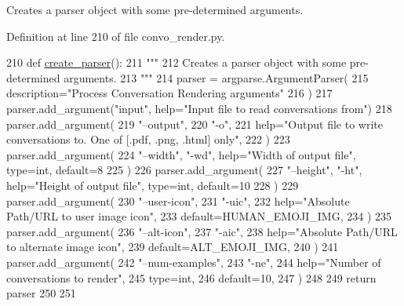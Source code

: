 \begin{DoxyVerb}Creates a parser object with some pre-determined arguments.
\end{DoxyVerb}
 

Definition at line 210 of file convo\+\_\+render.\+py.


\begin{DoxyCode}
210 \textcolor{keyword}{def }\hyperlink{namespaceparlai_1_1scripts_1_1convo__render_a4220e40f3e0c5ac320177b6e0f3d8e83}{create\_parser}():
211     \textcolor{stringliteral}{"""}
212 \textcolor{stringliteral}{    Creates a parser object with some pre-determined arguments.}
213 \textcolor{stringliteral}{    """}
214     parser = argparse.ArgumentParser(
215         description=\textcolor{stringliteral}{"Process Conversation Rendering arguments"}
216     )
217     parser.add\_argument(\textcolor{stringliteral}{"input"}, help=\textcolor{stringliteral}{"Input file to read conversations from"})
218     parser.add\_argument(
219         \textcolor{stringliteral}{"--output"},
220         \textcolor{stringliteral}{"-o"},
221         help=\textcolor{stringliteral}{"Output file to write conversations to. One of [.pdf, .png, .html] only"},
222     )
223     parser.add\_argument(
224         \textcolor{stringliteral}{"--width"}, \textcolor{stringliteral}{"-wd"}, help=\textcolor{stringliteral}{"Width of output file"}, type=int, default=8
225     )
226     parser.add\_argument(
227         \textcolor{stringliteral}{"--height"}, \textcolor{stringliteral}{"-ht"}, help=\textcolor{stringliteral}{"Height of output file"}, type=int, default=10
228     )
229     parser.add\_argument(
230         \textcolor{stringliteral}{"--user-icon"},
231         \textcolor{stringliteral}{"-uic"},
232         help=\textcolor{stringliteral}{"Absolute Path/URL to user image icon"},
233         default=HUMAN\_EMOJI\_IMG,
234     )
235     parser.add\_argument(
236         \textcolor{stringliteral}{"--alt-icon"},
237         \textcolor{stringliteral}{"-aic"},
238         help=\textcolor{stringliteral}{"Absolute Path/URL to alternate image icon"},
239         default=ALT\_EMOJI\_IMG,
240     )
241     parser.add\_argument(
242         \textcolor{stringliteral}{"--num-examples"},
243         \textcolor{stringliteral}{"-ne"},
244         help=\textcolor{stringliteral}{"Number of conversations to render"},
245         type=int,
246         default=10,
247     )
248 
249     \textcolor{keywordflow}{return} parser
250 
251 
\end{DoxyCode}
\mbox{\label{namespaceparlai_1_1scripts_1_1convo__render_a68e7e186a59ac2397560d0107f804ff3}} 
